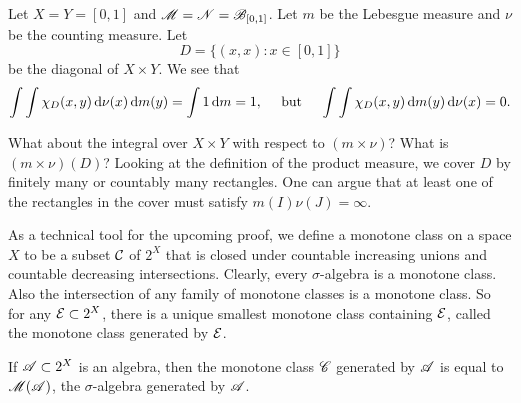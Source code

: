 \documentclass[12pt]{article} %
\begin{document}
\begin{example}
    Let $X = Y = [0,1]$ and $\mathscr{M} = \mathscr{N} = \mathscr{B}_{[0,1]}$. Let $m$ be the Lebesgue measure and $\nu$ be the counting measure. Let \[D = \{(x, x) : x \in [0,1]\}\] be the diagonal of $X \times Y$. We see that \[\int\int \chi_D(x, y) \, \mathrm{d} \nu (x) \, \mathrm{d} m (y) = \int 1\, \mathrm{d} m = 1, \ \ \ \ \text{but} \ \ \ \ \int \int \chi_D(x, y) \, \mathrm{d} m(y) \, \mathrm{d} \nu(x) = 0.\]

    What about the integral over $X \times Y$ with respect to $(m \times \nu)$? What is $(m \times \nu)(D)$? Looking at the definition of the product measure, we cover $D$ by finitely many or countably many rectangles. One can argue that at least one of the rectangles in the cover must satisfy $m(I)\nu(J) = \infty$.
\end{example}

As a technical tool for the upcoming proof, we define a monotone class on a space $X$ to be a subset $\mathcal{C}$ of $2^X$ that is closed under countable increasing unions and countable decreasing intersections. Clearly, every $\sigma$-algebra is a monotone class. Also the intersection of any family of monotone classes is a monotone class. So for any $\mathcal{E} \subset 2^X$, there is a unique smallest monotone class containing $\mathcal{E}$, called the monotone class generated by $\mathcal{E}$.

\begin{lemma}
    If $\mathscr{A} \subset 2^X$ is an algebra, then the monotone class $\mathscr{C}$ generated by $\mathscr{A}$ is equal to $\mathscr{M}(\mathscr{A})$, the $\sigma$-algebra generated by $\mathscr{A}$.
\end{lemma}
\end{document}

